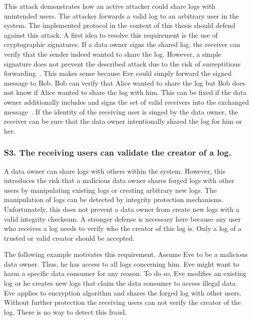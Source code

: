 \documentclass[../main.tex]{subfiles}
\begin{document}
This attack demonstrates how an active attacker could share logs with unintended users.
The attacker forwards a valid log to an arbitrary user in the system.
The implemented protocol in the context of this thesis should defend against this attack.
A first idea to resolve this requirement is the use of cryptographic signatures.
If a data owner signs the shared log, the receiver can verify that the sender indeed wanted to share the log.
However, a simple signature does not prevent the described attack due to the risk of surreptitious forwarding~\cite{Davis2001}.
This makes sense because Eve could simply forward the signed message to Bob.
Bob can verify that Alice wanted to share the log but Bob does not know if Alice wanted to share the log with him.
This can be fixed if the data owner additionally includes and signs the set of valid receivers into the exchanged message~\cite{Davis2001}.
If the identity of the receiving user is singed by the data owner, the receiver can be sure that the data owner intentionally shared the log for him or her.


\subsubsection{S3. The receiving users can validate the creator of a log.}

A data owner can share logs with others within the system.
However, this introduces the risk that a malicious data owner shares forged logs with other users by manipulating existing logs or creating arbitrary new logs.
The manipulation of logs can be detected by integrity protection mechanisms.
Unfortunately, this does not prevent a data owner from create new logs with a valid integrity checksum.
A stronger defense is necessary here because any user who receives a log needs to verify who the creator of this log is.
Only a log of a trusted or valid creator should be accepted.

The following example motivates this requirement.
Assume Eve to be a malicious data owner.
Thus, he has access to all logs concerning him.
Eve might want to harm a specific data consumer for any reason.
To do so, Eve modifies an existing log or he creates new logs that claim the data consumer to access illegal data.
Eve applies to encryption algorithm and shares the forged log with other users.
Without further protection the receiving users can not verify the creator of the log.
There is no way to detect this fraud.
\end{document}
